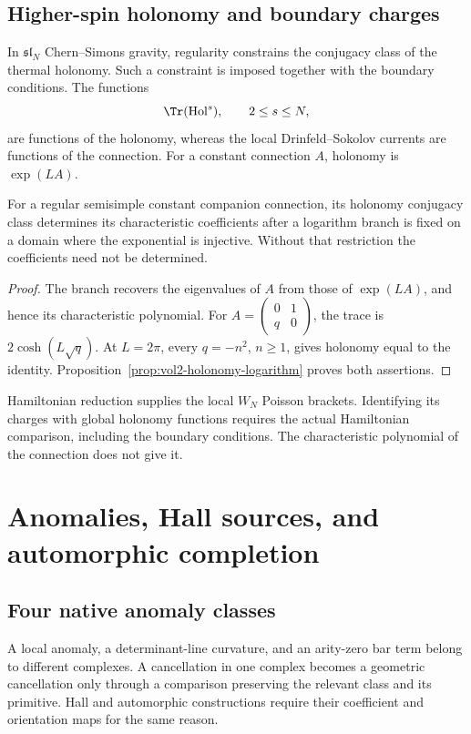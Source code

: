 \chapter{Higher-spin holonomy and boundary charges}
In $\mathfrak{sl}_N$ Chern--Simons gravity, regularity constrains the
conjugacy class of the thermal holonomy.
Such a constraint is imposed together with the boundary conditions.
The functions
\[
 \Tr(\operatorname{Hol}^s),
 \qquad 2\le s\le N,
\]
are functions of the holonomy, whereas the local
Drinfeld--Sokolov currents are functions of the connection.
For a constant connection $A$, holonomy is $\exp(LA)$.

\begin{proposition}
For a regular semisimple constant companion connection, its holonomy
conjugacy class determines its characteristic coefficients after
a logarithm branch is fixed on a domain where the exponential is
injective. Without that restriction the coefficients need not be
determined.
\end{proposition}
\begin{proof}
The branch recovers the eigenvalues of $A$ from those of $\exp(LA)$,
and hence its characteristic polynomial.
For $A=\left(\begin{smallmatrix}0&1\\q&0\end{smallmatrix}\right)$,
the trace is $2\cosh(L\sqrt q)$.
At $L=2\pi$, every $q=-n^2$, $n\ge1$, gives holonomy equal to the
identity. Proposition~\ref{prop:vol2-holonomy-logarithm} proves
both assertions.
\end{proof}

Hamiltonian reduction supplies the local $W_N$ Poisson brackets.
Identifying its charges with global holonomy functions requires
the actual Hamiltonian comparison, including the boundary conditions.
The characteristic polynomial of the connection does not give it.

\part{Anomalies, Hall sources, and automorphic completion}


\chapter{Four native anomaly classes}
A local anomaly, a determinant-line curvature, and an arity-zero bar term belong to different complexes. A cancellation in one complex becomes a geometric cancellation only through a comparison preserving the relevant class and its primitive. Hall and automorphic constructions require their coefficient and orientation maps for the same reason.

